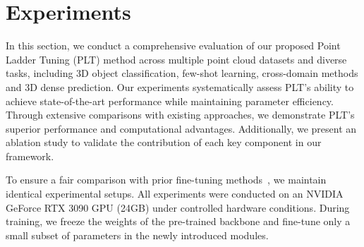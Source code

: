 

\section{Experiments}
\label{sec:experiments}


In this section, we conduct a comprehensive evaluation of our proposed Point Ladder Tuning (PLT) method across multiple point cloud datasets  and diverse tasks, including 3D object classification, few-shot learning, cross-domain methods and 3D dense prediction. Our experiments systematically assess PLT's ability to achieve state-of-the-art performance while maintaining parameter efficiency. Through extensive comparisons with existing approaches, we demonstrate PLT's superior performance and computational advantages. Additionally, we present an ablation study to validate the contribution of each key component in our framework.

To ensure a fair comparison with prior fine-tuning methods~\cite{zha2023instance, zhou2024dynamic}, we maintain identical experimental setups. All experiments were conducted on an NVIDIA GeForce RTX 3090 GPU (24GB) under controlled hardware conditions. During training, we freeze the weights of the pre-trained backbone and fine-tune only a small subset of parameters in the newly introduced modules.

